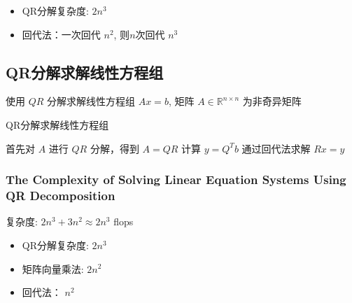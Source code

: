 \begin{itemize}
    \item QR分解复杂度: $ 2 n^{3} $
    \item 回代法：一次回代 $ n^{2} $, 则$n$次回代 $ n^{3} $
\end{itemize}


\subsection{QR分解求解线性方程组}

使用 $ Q R $ 分解求解线性方程组 $ A x=b $, 矩阵 $ A \in \mathbb{R}^{n \times n} $ 为非奇异矩阵

\begin{algorithm}[htbp]
    \caption{QR分解求解线性方程组}
    首先对 $ A $ 进行 $ Q R $ 分解，得到 $ A=Q R $\;
    计算 $ y=Q^{T} b $\;
    通过回代法求解 $ R x=y $\;
\end{algorithm}


\subsubsection{The Complexity of Solving Linear Equation Systems Using QR Decomposition}

复杂度: $ 2 n^{3}+3 n^{2} \approx 2 n^{3} $ flops 

\begin{itemize}
    \item QR分解复杂度: $ 2 n^{3} $
    \item 矩阵向量乘法: $ 2 n^{2} $
    \item 回代法： $ n^{2} $
\end{itemize}
